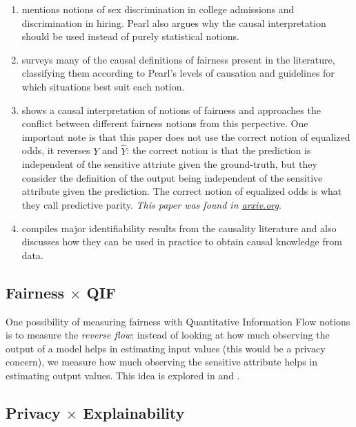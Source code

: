 \begin{enumerate}
\item \cite{Causality} mentions notions of sex discrimination in college admissions and discrimination in hiring. Pearl also argues why the causal interpretation should be used instead of purely statistical notions.
\item \cite{When causality meets fairness: A survey} surveys many of the causal definitions of fairness present in the literature, classifying them according to Pearl's levels of causation and guidelines for which situations best suit each notion.
\item \cite{The Impossibility Theorem of Machine Fairness: a Causal Perspective} shows a causal interpretation of notions of fairness and approaches the conflict between different fairness notions from this perpective. One important note is that this paper does not use the correct notion of equalized odds, it reverses $Y$ and $\hat{Y}$: the correct notion is that the prediction is independent of the sensitive attriute given the ground-truth, but they consider the definition of the output being independent of the sensitive attribute given the prediction. The correct notion of equalized odds is what they call predictive parity. \emph{This paper was found in \url{arxiv.org}}.
\item \cite{Identifiability of Causal-based ML Fairness Notions} compiles major identifiability results from the causality literature and also discusses how they can be used in practice to obtain causal knowledge from data.
\end{enumerate}

\subsection{Fairness $\times$ QIF}

One possibility of measuring fairness with Quantitative Information Flow notions is to measure the \emph{reverse flow}: instead of looking at how much observing the output of a model helps in estimating input values (this would be a privacy concern), we measure how much observing the sensitive attribute helps in estimating output values. This idea is explored in \cite{On the duality of privacy and fairness} and \cite{On the relation of privacy and fairness through the lenses of quantitative information flow}.

\subsection{Privacy $\times$ Explainability}

